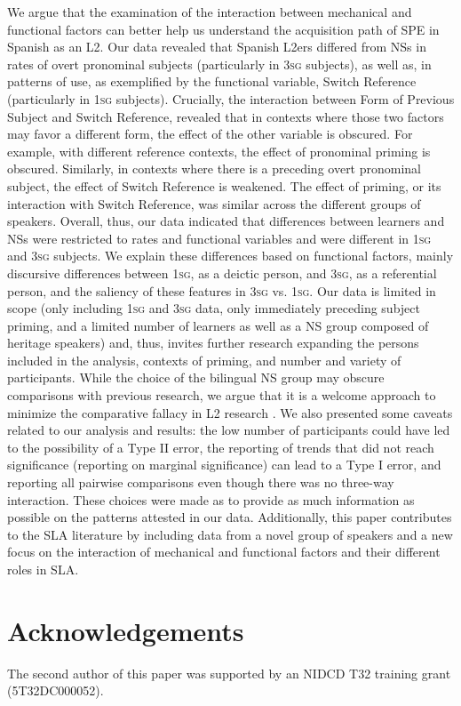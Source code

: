 \documentclass[output=paper,colorlinks,citecolor=brown,draftmode]{langscibook}
\begin{document}
We argue that the examination of the interaction between mechanical and functional factors can better help us understand the acquisition path of SPE in Spanish as an L2. Our data revealed that Spanish L2ers differed from NSs in rates of overt pronominal subjects (particularly in 3\textsc{sg} subjects), as well as, in patterns of use, as exemplified by the functional variable, Switch Reference (particularly in 1\textsc{sg} subjects). Crucially, the interaction between Form of Previous Subject and Switch Reference, revealed that in contexts where those two factors may favor a different form, the effect of the other variable is obscured. For example, with different reference contexts, the effect of pronominal priming is obscured. Similarly, in contexts where there is a preceding overt pronominal subject, the effect of Switch Reference is weakened. The effect of priming, or its interaction with Switch Reference, was similar across the different groups of speakers. Overall, thus, our data indicated that differences between learners and NSs were restricted to rates and functional variables and were different in 1\textsc{sg} and 3\textsc{sg} subjects. We explain these differences based on functional factors, mainly discursive differences between 1\textsc{sg}, as a deictic person, and 3\textsc{sg}, as a referential person, and the saliency of these features in 3\textsc{sg} vs. 1\textsc{sg}. Our data is limited in scope (only including 1\textsc{sg} and 3\textsc{sg} data, only immediately preceding subject priming, and a limited number of learners as well as a NS group composed of heritage speakers) and, thus, invites further research expanding the persons included in the analysis, contexts of priming, and number and variety of participants. While the choice of the bilingual NS group may obscure comparisons with previous research, we argue that it is a welcome approach to minimize the comparative fallacy in L2 research \citep{Bley-Vroman1983}. We also presented some caveats related to our analysis and results: the low number of participants could have led to the possibility of a Type II error, the reporting of trends that did not reach significance (reporting on marginal significance) can lead to a Type I error, and reporting all pairwise comparisons even though there was no three-way interaction. These choices were made as to provide as much information as possible on the patterns attested in our data. Additionally, this paper contributes to the SLA literature by including data from a novel group of speakers and a new focus on the interaction of mechanical and functional factors and their different roles in SLA.


\section*{Acknowledgements}
The second author of this paper was supported by an NIDCD T32 training grant (5T32DC000052).

\printbibliography[heading=subbibliography,notkeyword=this]
\end{document}
